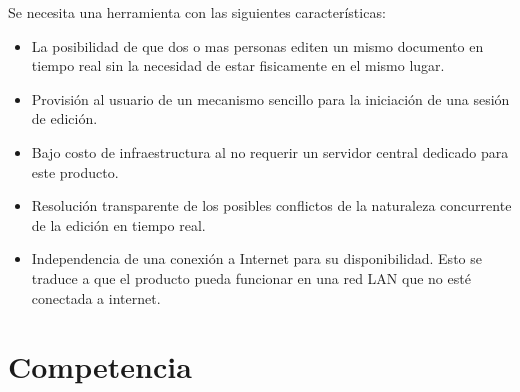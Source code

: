 \documentclass[12pt,a4paper]{article}
\begin{document}
	Se necesita una herramienta con las siguientes características:
	\begin{itemize}
		\item La posibilidad de que dos o mas personas editen un mismo documento en tiempo real sin la necesidad de estar fisicamente en el mismo lugar.
		\item Provisión al usuario de un mecanismo sencillo para la iniciación de una sesión de edición.
		\item Bajo costo de infraestructura al no requerir un servidor central dedicado para este producto.
		\item Resolución transparente de los posibles conflictos de la naturaleza concurrente de la edición en tiempo real.
		\item Independencia de una conexión a Internet para su disponibilidad. Esto se traduce a que el producto pueda funcionar en una red LAN que no esté conectada a internet.
	\end{itemize}

	\section{Competencia}
	
\end{document}
